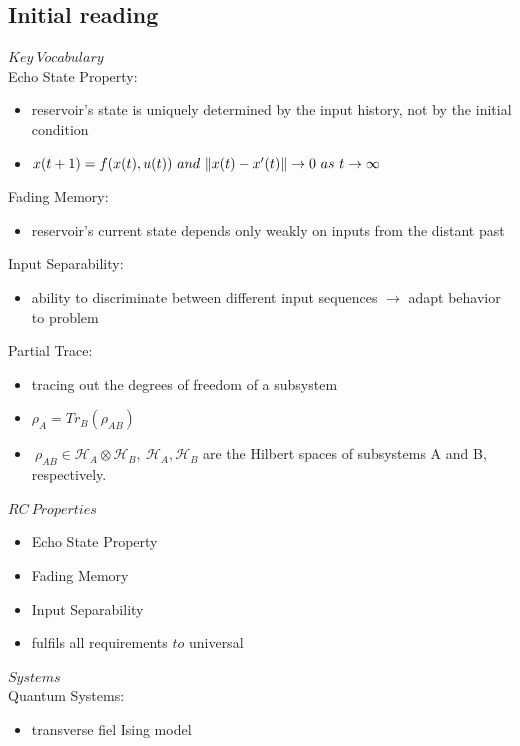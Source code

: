 \subsection*{Initial reading}
$Key \ Vocabulary$ \\
Echo State Property:
\begin{itemize}
    \item reservoir's state is uniquely determined by the input history, not by the initial condition
    \item $x(t+1) = f(x(t), u(t)) \ and \ \norm{x(t)-x'(t)} \rightarrow 0 \ as \ t \rightarrow \infty$
\end{itemize}

Fading Memory:
\begin{itemize}
    \item reservoir's current state depends only weakly on inputs from the distant past
\end{itemize}

Input Separability:
\begin{itemize}
    \item ability to discriminate between different input sequences $\to$ adapt behavior to problem
\end{itemize}

Partial Trace:
\begin{itemize}
    \item tracing out the degrees of freedom of a subsystem
    \item $\rho_A = Tr_B(\rho_{AB})$
    \item $\ \rho_{AB}\in \mathcal{H}_A \otimes \mathcal{H}_B, \ \mathcal{H}_A, \mathcal{H}_B$ are the Hilbert spaces of subsystems A and B, respectively.
\end{itemize}

$RC \ Properties$
\begin{itemize}
    \item Echo State Property
    \item Fading Memory
    \item Input Separability
    \item fulfils all requirements $to$ universal
\end{itemize}

$Systems$ \\
Quantum Systems:
\begin{itemize}
    \item transverse fiel Ising model
\end{itemize}



